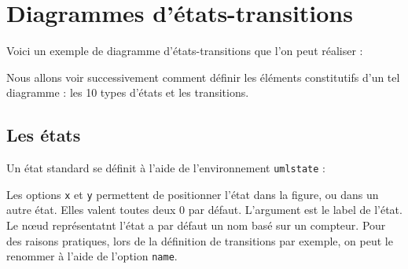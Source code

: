 \documentclass[a4paper,11pt]{report}
\newcommand{\inputTikZ}[1]{%
  }%
\newcommand{\inputTikZ}[1]{%
    \texttt{[image: fig/\#1.pdf]}%
  }%
\begin{document}
\vspace{-0.4cm}
{\color{red!70!black}

}

\begin{center}
\inputTikZ{figure50}
\end{center}


\chapter{Diagrammes d'états-transitions}\label{c.statetrans}

Voici un exemple de diagramme d'états-transitions que l'on peut réaliser :

\begin{center}
\inputTikZ{statediagex}
\end{center}

Nous allons voir successivement comment définir les éléments constitutifs d'un tel diagramme : les 10 types d'états et les transitions.

\newpage

\section{Les états}\label{s.state}

Un état \og standard\fg{} se définit à l'aide de l'environnement {\tt umlstate} :

\medskip

\begin{minipage}{0.51\textwidth}

\end{minipage}
\begin{minipage}{0.49\textwidth}
\begin{center}
\inputTikZ{figure51}
\end{center}
\end{minipage}

\medskip

Les options {\tt x} et {\tt y} permettent de positionner l'état dans la figure, ou dans un autre état. Elles valent toutes deux 0 par défaut. L'argument est le label de l'état. Le n\oe{}ud représentatnt l'état a par défaut un nom basé sur un compteur. Pour des raisons pratiques, lors de la définition de transitions par exemple, on peut le renommer à l'aide de l'option {\tt name}.
\end{document}
